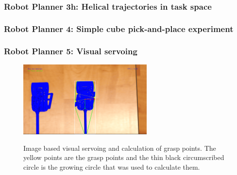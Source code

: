 \begin{frame}
\frametitle{Robot Planner 3h: Helical trajectories in task space}
\end{frame}

\begin{frame}
\frametitle{Robot Planner 4: Simple cube pick-and-place experiment}
\end{frame}

\begin{frame}
\frametitle{Robot Planner 5: Visual servoing}
\begin{center}
\begin{figure}[!htb]
\centering
\includegraphics[width=0.6\textwidth]{../images/grasp-points-triangle.png}\\
\caption{Image based visual servoing and calculation of grasp points. The yellow points are the grasp points and the thin black circumscribed circle is the growing circle that was used to calculate them.}
\end{figure}
\end{center}
\end{frame}

